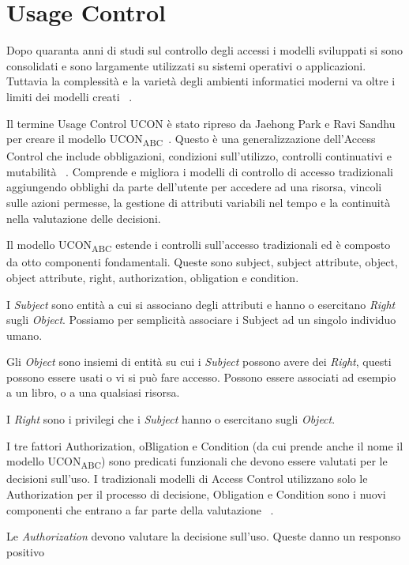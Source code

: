 \section{Usage Control}
\label{sec:Usage_Control}
Dopo quaranta anni di studi sul controllo degli accessi i modelli sviluppati si sono consolidati e sono largamente utilizzati
su sistemi operativi o applicazioni. Tuttavia la complessità e la varietà degli ambienti informatici moderni va oltre i limiti
dei modelli creati ~\cite{uconSN}.\par
Il termine Usage Control \ac{UCON} è stato ripreso da Jaehong Park e Ravi Sandhu per creare il modello UCON\textsubscript{ABC}~\cite{ucon}.
Questo è una generalizzazione dell'Access Control che include obbligazioni, condizioni sull'utilizzo,
controlli continuativi e mutabilità ~\cite{UCRT}. Comprende e migliora i modelli di controllo di accesso tradizionali aggiungendo
obblighi da parte dell'utente per accedere ad una risorsa, vincoli sulle azioni permesse,
la gestione di attributi variabili nel tempo e la continuità nella valutazione delle decisioni.\par
Il modello UCON\textsubscript{ABC} estende i controlli sull'accesso tradizionali ed è composto da otto componenti fondamentali.
Queste sono subject, subject attribute, object, object attribute, right, authorization, obligation e condition.\par
{}
I \emph{Subject} sono entità a cui si associano degli attributi e hanno o esercitano \emph{Right} sugli \emph{Object}. Possiamo per semplicità
associare i Subject ad un singolo individuo umano.\par
Gli \emph{Object} sono insiemi di entità su cui i \emph{Subject} possono avere dei \emph{Right}, questi possono essere usati o vi si può
fare accesso. Possono essere associati ad esempio a un libro, o a una qualsiasi risorsa.\par
I \emph{Right} sono i privilegi che i \emph{Subject} hanno o esercitano sugli \emph{Object}.\par
I tre fattori Authorization, oBligation e Condition (da cui prende anche il
nome il modello UCON\textsubscript{ABC}) sono predicati funzionali che devono essere valutati per le decisioni sull'uso.
I tradizionali modelli di Access Control utilizzano solo le Authorization per il processo di decisione, Obligation e Condition
sono i nuovi componenti che entrano a far parte della valutazione ~\cite{IEEE}.\par
Le \emph{Authorization} devono valutare la decisione sull'uso. Queste danno un responso positivo
